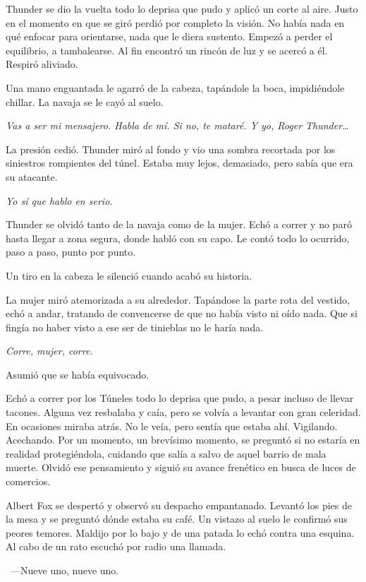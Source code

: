 Thunder se dio la vuelta todo lo deprisa que pudo y aplicó un corte al aire. Justo en el momento en que se giró perdió por completo la visión. No había nada en qué enfocar para orientarse, nada que le diera sustento. Empezó a perder el equilibrio, a tambalearse. Al fin encontró un rincón de luz y se acercó a él. Respiró aliviado.

Una mano enguantada le agarró de la cabeza, tapándole la boca, impidiéndole chillar. La navaja se le cayó al suelo.

\emph{Vas a ser mi mensajero. Habla de mí. Si no, te mataré. Y yo, Roger Thunder\dots}

La presión cedió. Thunder miró al fondo y vio una sombra recortada por los siniestros rompientes del túnel. Estaba muy lejos, demasiado, pero sabía que era su atacante.

\emph{Yo sí que hablo en serio.}

Thunder se olvidó tanto de la navaja como de la mujer. Echó a correr y no paró hasta llegar a zona segura, donde habló con su capo. Le contó todo lo ocurrido, paso a paso, punto por punto.

Un tiro en la cabeza le silenció cuando acabó su historia.

La mujer miró atemorizada a su alrededor. Tapándose la parte rota del vestido, echó a andar, tratando de convencerse de que no había visto ni oído nada. Que si fingía no haber visto a ese ser de tinieblas no le haría nada.

\emph{Corre, mujer, corre.}

Asumió que se había equivocado.

Echó a correr por los Túneles todo lo deprisa que pudo, a pesar incluso de llevar tacones. Alguna vez resbalaba y caía, pero se volvía a levantar con gran celeridad. En ocasiones miraba atrás. No le veía, pero sentía que estaba ahí. Vigilando. Acechando. Por un momento, un brevísimo momento, se preguntó si no estaría en realidad protegiéndola, cuidando que salía a salvo de aquel barrio de mala muerte. Olvidó ese pensamiento y siguió su avance frenético en busca de luces de comercios.

\bigskip\noindent
Albert Fox se despertó y observó su despacho empantanado. Levantó los pies de la mesa y se preguntó dónde estaba su café. Un vistazo al suelo le confirmó sus peores temores. Maldijo por lo bajo y de una patada lo echó contra una esquina. Al cabo de un rato escuchó por radio una llamada.

~---Nueve uno, nueve uno.

